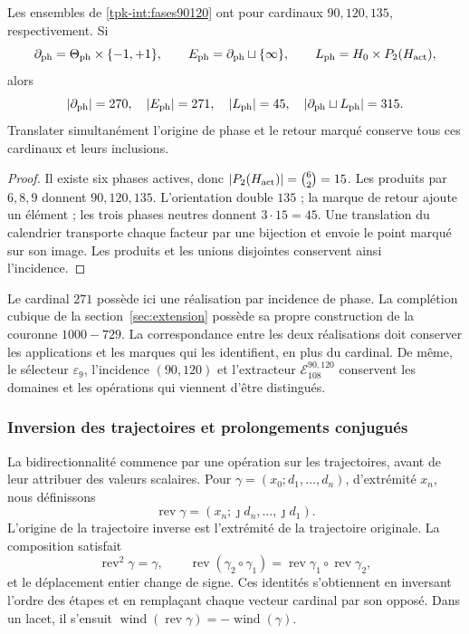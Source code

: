 \begin{proposition}
\label{tpk-int:cardinales}
Les ensembles de \eqref{tpk-int:fases90120} ont pour cardinaux \(90,120,135\), respectivement. Si
\[
 \partial_{\rm ph}=\Theta_{\rm ph}\times\{-1,+1\},\qquad
 E_{\rm ph}=\partial_{\rm ph}\sqcup\{\infty\},\qquad
 L_{\rm ph}=H_0\times P_2(H_{\rm act}),
\]
alors
\[
 |\partial_{\rm ph}|=270,\quad |E_{\rm ph}|=271,\quad
 |L_{\rm ph}|=45,\quad
 |\partial_{\rm ph}\sqcup L_{\rm ph}|=315.
\]
Translater simultanément l'origine de phase et le retour marqué conserve
tous ces cardinaux et leurs inclusions.
\end{proposition}
\begin{proof}
Il existe six phases actives, donc
\(|P_2(H_{\rm act})|=\binom62=15\). Les produits par
\(6,8,9\) donnent \(90,120,135\). L'orientation double \(135\) ;
la marque de retour ajoute un élément ; les trois phases neutres donnent
\(3\cdot15=45\). Une translation du calendrier transporte chaque
facteur par une bijection et envoie le point marqué sur son image. Les
produits et les unions disjointes conservent ainsi l'incidence.
\end{proof}

Le cardinal \(271\) possède ici une réalisation par incidence de phase. La complétion cubique de la section~\ref{sec:extension} possède sa propre construction de la couronne \(1000-729\). La correspondance entre les deux réalisations doit conserver les applications et les marques qui les identifient, en plus du cardinal. De même, le sélecteur \(\varepsilon_9\), l'incidence \((90,120)\) et l'extracteur \(\mathcal E_{108}^{90,120}\) conservent les domaines et les opérations qui viennent d'être distingués.

\subsubsection{Inversion des trajectoires et prolongements conjugués}
\label{tpk-int:bidireccionalidad}

La bidirectionnalité commence par une opération sur les trajectoires, avant
de leur attribuer des valeurs scalaires. Pour
\(\gamma=(x_0;d_1,\ldots,d_n)\), d'extrémité \(x_n\), nous définissons
\[
 \operatorname{rev}\gamma
   =(x_n;\jmath d_n,\ldots,\jmath d_1).
\]
L'origine de la trajectoire inverse est l'extrémité de la trajectoire originale.
La composition satisfait
\[
 \operatorname{rev}^2\gamma=\gamma,\qquad
 \operatorname{rev}(\gamma_2\circ\gamma_1)
   =\operatorname{rev}\gamma_1\circ\operatorname{rev}\gamma_2,
\]
et le déplacement entier change de signe. Ces identités s'obtiennent
en inversant l'ordre des étapes et en remplaçant chaque vecteur cardinal par
son opposé. Dans un lacet, il s'ensuit
\(\operatorname{wind}(\operatorname{rev}\gamma)
=-\operatorname{wind}(\gamma)\).

